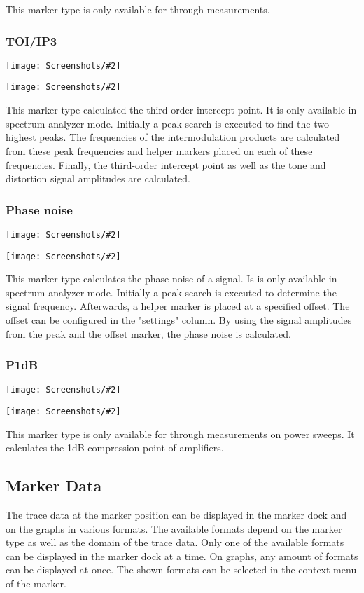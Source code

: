 \documentclass[a4paper,11pt]{article}
\newcommand{\screenshot}[2]{\begin{center}
\texttt{[image: Screenshots/\#2]}
\end{center}}
\begin{document}
This marker type is only available for through measurements.
\subsubsection{TOI/IP3}
\screenshot{1.0}{MarkerTOIGraph.png}
\screenshot{1.0}{MarkerTOITable.png}
This marker type calculated the third-order intercept point. It is only available in spectrum analyzer mode. Initially a peak search is executed to find the two highest peaks. The frequencies of the intermodulation products are calculated from these peak frequencies and helper markers placed on each of these frequencies. Finally, the third-order intercept point as well as the tone and distortion signal amplitudes are calculated.
\subsubsection{Phase noise}
\screenshot{1.0}{MarkerPhasenoiseGraph.png}
\screenshot{1.0}{MarkerPhasenoiseTable.png}
This marker type calculates the phase noise of a signal. Is is only available in spectrum analyzer mode. Initially a peak search is executed to determine the signal frequency. Afterwards, a helper marker is placed at a specified offset. The offset can be configured in the "settings" column. By using the signal amplitudes from the peak and the offset marker, the phase noise is calculated.

\subsubsection{P1dB}
\screenshot{1.0}{MarkerP1dBGraph.png}
\screenshot{1.0}{MarkerP1dBTable.png}
This marker type is only available for through measurements on power sweeps. It calculates the 1dB compression point of amplifiers.

\subsection{Marker Data}
The trace data at the marker position can be displayed in the marker dock and on the graphs in various formats. The available formats depend on the marker type as well as the domain of the trace data. Only one of the available formats can be displayed in the marker dock at a time. On graphs, any amount of formats can be displayed at once. The shown formats can be selected in the context menu of the marker.
\end{document}
